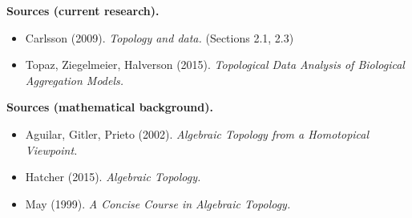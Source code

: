 \documentclass[10pt]{article}
\begin{document}
\vspacing

\noindent
\textbf{Sources (current research).}
\begin{itemize}
\item Carlsson (2009). \textit{Topology and data.} (Sections 2.1, 2.3)
\item Topaz, Ziegelmeier, Halverson (2015). \textit{Topological Data Analysis of Biological Aggregation Models.}
\end{itemize}

\vspacing

\noindent
\textbf{Sources (mathematical background).}
\begin{itemize}
\item Aguilar, Gitler, Prieto (2002). \textit{Algebraic Topology from a Homotopical Viewpoint.}
\item Hatcher (2015). \textit{Algebraic Topology.}
\item May (1999). \textit{A Concise Course in Algebraic Topology.}
\end{itemize}

\noindent
\end{document}

